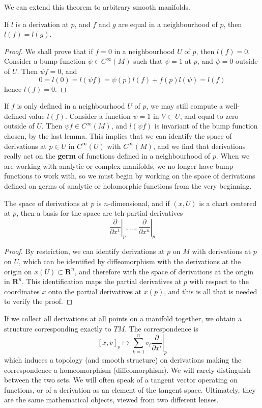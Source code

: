 We can extend this theorem to arbitrary smooth manifolds.

\begin{lemma}
    If $l$ is a derivation at $p$, and $f$ and $g$ are equal in a neighbourhood of $p$, then $l(f) = l(g)$.
\end{lemma}
\begin{proof}
    We shall prove that if $f = 0$ in a neighbourhood $U$ of $p$, then $l(f) = 0$. Consider a bump function $\psi \in C^\infty(M)$ such that $\psi = 1$ at $p$, and $\psi = 0$ outside of $U$. Then $\psi f = 0$, and
    \[ 0 = l(0) = l(\psi f) = \psi(p) l(f) + f(p) l(\psi) = l(f) \]
    hence $l(f) = 0$.
\end{proof}

If $f$ is only defined in a neighbourhood $U$ of $p$, we may still compute a well-defined value $l(f)$. Consider a function $\psi = 1$ in $V \subset U$, and equal to zero outside of $U$. Then $\psi f \in C^\infty(M)$, and $l(\psi f)$ is invariant of the bump function chosen, by the last lemma. This implies that we can identify the space of derivations at $p \in U$ in $C^\infty(U)$ with $C^\infty(M)$, and we find that derivations really act on the {\bf germ} of functions defined in a neighbourhood of $p$. When we are working with analytic or complex manifolds, we no longer have bump functions to work with, so we must begin by working on the space of derivations defined on germs of analytic or holomorphic functions from the very beginning.

\begin{theorem}
    The space of derivations at $p$ is $n$-dimensional, and if $(x,U)$ is a chart centered at $p$, then a basis for the space are teh partial derivatives
    \[ \left.\frac{\partial}{\partial x^1}\right|_p, \dots, \left.\frac{\partial}{\partial x^n}\right|_p \]
\end{theorem}
\begin{proof}
    By restriction, we can identify derivations at $p$ on $M$ with derivations at $p$ on $U$, which can be identified by diffeomorphism with the derivations at the origin on $x(U) \subset \mathbf{R}^n$, and therefore with the space of derivations at the origin in $\mathbf{R}^n$. This identification maps the partial derivatives at $p$ with respect to the coordinates $x$ onto the partial derivatives at $x(p)$, and this is all that is needed to verify the proof.
\end{proof}

If we collect all derivations at all points on a manifold together, we obtain a structure corresponding exactly to $TM$. The correspondence is
%
\[ [x,v]_p \mapsto \sum_{k = 1}^n v_i \left.\frac{\partial}{\partial x^i}\right|_p \]
%
which induces a topology (and smooth structure) on derivations making the correspondence a homeomorphism (diffeomorphism). We will rarely distinguish between the two sets. We will often speak of a tangent vector operating on functions, or of a derivation as an element of the tangent space. Ultimately, they are the same mathematical objects, viewed from two different lenses.

